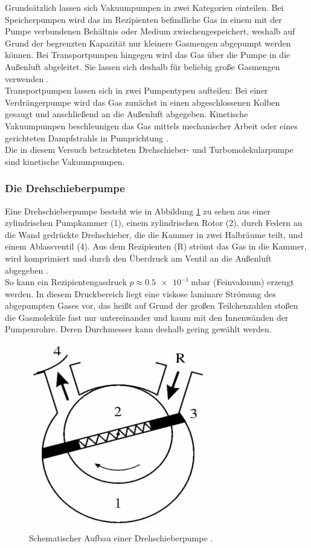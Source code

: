 Grundsätzlich lassen sich Vakuumpumpen in zwei Kategorien einteilen.
Bei Speicherpumpen wird das im Rezipienten befindliche Gas in einem mit der Pumpe verbundenen Behältnis oder Medium zwischengespeichert, weshalb auf Grund der begrenzten Kapazität nur kleinere Gasmengen abgepumpt werden können.
Bei Transportpumpen hingegen wird das Gas über die Pumpe in die Außenluft abgeleitet. Sie lassen sich deshalb für beliebig große Gasmengen verwenden \cite{Jena}.\\
Transportpumpen lassen sich in zwei Pumpentypen aufteilen: Bei einer Verdrängerpumpe wird das Gas zunächst in einen abgeschlossenen Kolben gesaugt und anschließend an die Außenluft abgegeben. Kinetische Vakuumpumpen beschleunigen das Gas mittels mechanischer Arbeit oder eines gerichteten Dampfstrahls in Pumprichtung \cite{Pfeiffer}.\\
Die in diesem Versuch betrachteten Drehschieber- und Turbomolekularpumpe sind kinetische Vakuumpumpen.

\subsubsection{Die Drehschieberpumpe}

Eine Drehschieberpumpe besteht wie in Abbildung \ref{fig:DSP} zu sehen aus einer zylindrischen Pumpkammer (1), einem zylindrischen Rotor (2), durch Federn an die Wand gedrückte Drehschieber, die die Kammer in zwei Halbräume teilt, und einem Ablassventil (4). Aus dem Rezipienten (R) strömt das Gas in die Kammer, wird komprimiert und durch den Überdruck am Ventil an die Außenluft abgegeben \cite{Jena}.\\
So kann ein Rezipientengasdruck $p\approx \SI{0,5e-1}{\milli\bar}$ (Feinvakuum) erzeugt werden.
In diesem Druckbereich liegt eine viskose laminare Strömung des abgepumpten Gases vor, das heißt auf Grund der großen Teilchenzahlen stoßen die Gasmoleküle fast nur untereinander und kaum mit den Innenwänden der Pumpenrohre. Deren Durchmesser kann deshalb gering gewählt werden.
\begin{figure}
\centering
\includegraphics[scale=0.5]{content/images/Drehschieber.jpg}
\caption{Schematischer Aufbau einer Drehschieberpumpe \cite{Jena}.}
\label{fig:DSP}
\end{figure}


